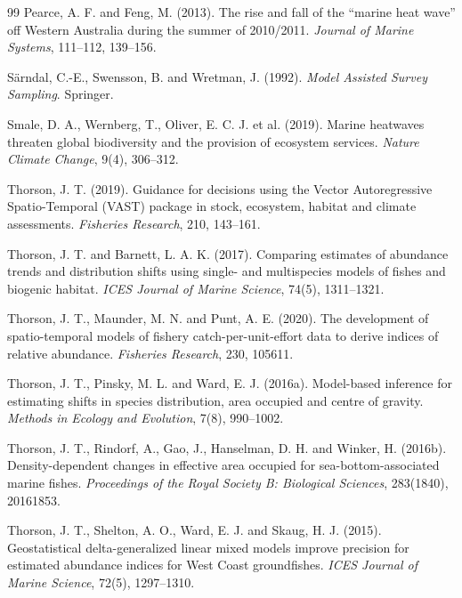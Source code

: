 \begin{thebibliography}{99}
Pearce, A. F. and Feng, M. (2013). The rise and fall of the ``marine heat wave'' off Western Australia during the summer of 2010/2011. \textit{Journal of Marine Systems}, 111--112, 139--156.

S\"arndal, C.-E., Swensson, B. and Wretman, J. (1992). \textit{Model Assisted Survey Sampling}. Springer.

Smale, D. A., Wernberg, T., Oliver, E. C. J. et al. (2019). Marine heatwaves threaten global biodiversity and the provision of ecosystem services. \textit{Nature Climate Change}, 9(4), 306--312.

Thorson, J. T. (2019). Guidance for decisions using the Vector Autoregressive Spatio-Temporal (VAST) package in stock, ecosystem, habitat and climate assessments. \textit{Fisheries Research}, 210, 143--161.

Thorson, J. T. and Barnett, L. A. K. (2017). Comparing estimates of abundance trends and distribution shifts using single- and multispecies models of fishes and biogenic habitat. \textit{ICES Journal of Marine Science}, 74(5), 1311--1321.

Thorson, J. T., Maunder, M. N. and Punt, A. E. (2020). The development of spatio-temporal models of fishery catch-per-unit-effort data to derive indices of relative abundance. \textit{Fisheries Research}, 230, 105611.

Thorson, J. T., Pinsky, M. L. and Ward, E. J. (2016a). Model-based inference for estimating shifts in species distribution, area occupied and centre of gravity. \textit{Methods in Ecology and Evolution}, 7(8), 990--1002.

Thorson, J. T., Rindorf, A., Gao, J., Hanselman, D. H. and Winker, H. (2016b). Density-dependent changes in effective area occupied for sea-bottom-associated marine fishes. \textit{Proceedings of the Royal Society B: Biological Sciences}, 283(1840), 20161853.

Thorson, J. T., Shelton, A. O., Ward, E. J. and Skaug, H. J. (2015). Geostatistical delta-generalized linear mixed models improve precision for estimated abundance indices for West Coast groundfishes. \textit{ICES Journal of Marine Science}, 72(5), 1297--1310.


\end{thebibliography}
